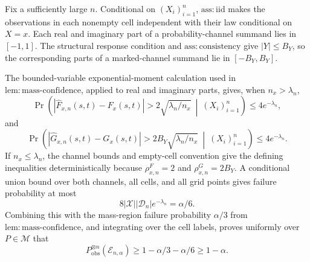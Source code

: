 Fix a sufficiently large \(n\). Conditional on \((X_i)_{i=1}^n\), \(\mathrm{ass{:}iid}\) makes the observations in each nonempty cell independent with their law conditional on \(X=x\). Each real and imaginary part of a probability-channel summand lies in \([-1,1]\). The structural response condition and \(\mathrm{ass{:}consistency}\) give \(|Y|\le B_Y\), so the corresponding parts of a marked-channel summand lie in \([-B_Y,B_Y]\).

The bounded-variable exponential-moment calculation used in \(\mathrm{lem{:}mass\text{-}confidence}\), applied to real and imaginary parts, gives, when \(n_x>\lambda_n\),
\[
 \Pr\left(
 |\widehat F_{x,n}(s,t)-F_x(s,t)|>2\sqrt{\lambda_n/n_x}
 \ \middle|\ (X_i)_{i=1}^n\right)\le4e^{-\lambda_n},
\]
and
\[
 \Pr\left(
 |\widehat G_{x,n}(s,t)-G_x(s,t)|>2B_Y\sqrt{\lambda_n/n_x}
 \ \middle|\ (X_i)_{i=1}^n\right)\le4e^{-\lambda_n}.
\]
If \(n_x\le\lambda_n\), the channel bounds and empty-cell convention give the defining inequalities deterministically because \(\rho^F_{x,n}=2\) and \(\rho^G_{x,n}=2B_Y\). A conditional union bound over both channels, all cells, and all grid points gives failure probability at most
\[
 8|\mathcal X||\mathcal D_n|e^{-\lambda_n}=\alpha/6.
\]
Combining this with the mass-region failure probability \(\alpha/3\) from \(\mathrm{lem{:}mass\text{-}confidence}\), and integrating over the cell labels, proves uniformly over \(P\in\mathcal M\) that
\[
 P_{\mathrm{obs}}^{\otimes n}(\mathcal E_{n,\alpha})
 \ge1-\alpha/3-\alpha/6\ge1-\alpha.
\]

